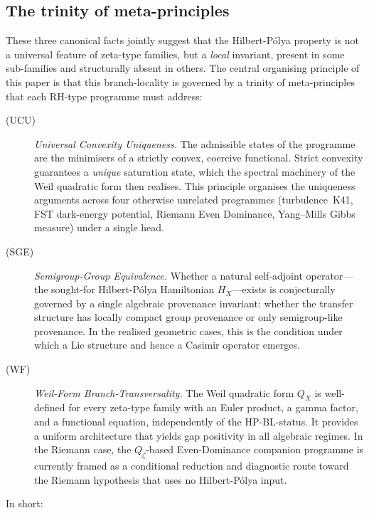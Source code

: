 \documentclass[11pt]{article}
\theoremstyle{definition}
\theoremstyle{remark}
\newcommand{\HBL}{\mathrm{HP\text{-}BL}}
\begin{document}
\subsection{The trinity of meta-principles}
\label{sec:trinity}

These three canonical facts jointly suggest that the Hilbert-P\'olya
property is not a universal feature of zeta-type families, but a
\emph{local} invariant, present in some sub-families and structurally
absent in others. The central organising principle of this paper is
that this branch-locality is governed by a trinity of meta-principles
that each RH-type programme must address:

\begin{description}
\item[(UCU)] \emph{Universal Convexity Uniqueness.} The admissible
  states of the programme are the minimisers of a strictly convex,
  coercive functional. Strict convexity guarantees a \emph{unique}
  saturation state, which the spectral machinery of the Weil quadratic
  form then realises. This principle organises the uniqueness
  arguments across four otherwise unrelated programmes
  (turbulence~K41, FST dark-energy potential, Riemann Even Dominance,
  Yang--Mills Gibbs measure) under a single head.

\item[(SGE)] \emph{Semigroup-Group Equivalence.} Whether a natural
  self-adjoint operator---the sought-for Hilbert-P\'olya Hamiltonian
  $H_X$---exists is conjecturally governed by a single algebraic
  provenance invariant: whether the transfer structure has locally
  compact group provenance or only semigroup-like provenance. In the
  realised geometric cases, this is the condition under which a Lie
  structure and hence a Casimir operator emerges.

\item[(WF)] \emph{Weil-Form Branch-Transversality.} The Weil
  quadratic form $Q_X$ is well-defined for every zeta-type family
  with an Euler product, a gamma factor, and a functional equation,
  independently of the $\HBL$-status. It provides a uniform
  architecture that yields gap positivity in all algebraic regimes.
  In the Riemann case, the $Q_\zeta$-based Even-Dominance
  companion programme \cite{Geiger2026RHII} is currently framed as a
  conditional reduction and diagnostic route toward the Riemann
  hypothesis that uses no Hilbert-P\'olya input.
\end{description}

In short:
\end{document}
